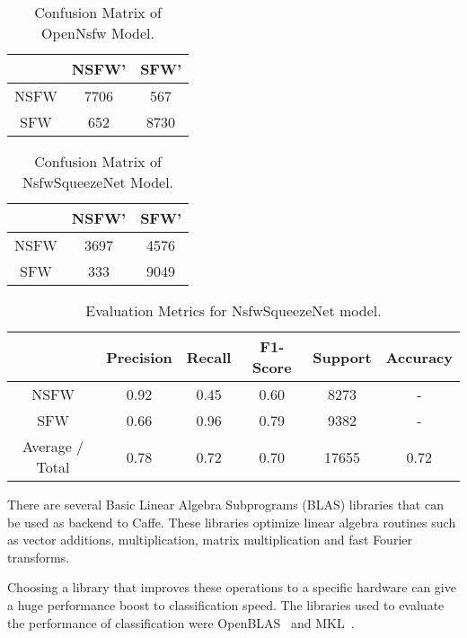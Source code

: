 \begin{table}[]
\centering
\caption{Confusion Matrix of OpenNsfw Model.}
\label{tbl:cm_opennsfw}
\begin{tabular}{c|c|c|}
\cline{2-3}
                           & NSFW' & SFW' \\ \hline
\multicolumn{1}{|c|}{NSFW} & 7706  & 567  \\ \hline
\multicolumn{1}{|c|}{SFW}  & 652   & 8730 \\ \hline
\end{tabular}
\end{table}

\begin{table}[]
\centering
\caption{Confusion Matrix of NsfwSqueezeNet Model.}
\label{tbl:cm_nsfwsqueeze}
\begin{tabular}{c|c|c|}
\cline{2-3}
                           & NSFW' & SFW' \\ \hline
\multicolumn{1}{|c|}{NSFW} & 3697  & 4576  \\ \hline
\multicolumn{1}{|c|}{SFW}  & 333   & 9049 \\ \hline
\end{tabular}
\end{table}


\begin{table}[]
\centering
\caption{Evaluation Metrics for NsfwSqueezeNet model.}
\label{tbl:metrics_nsfw_squeeze}
\begin{tabular}{c|c|c|c|c|c|}
\cline{2-6}
                                      & Precision & Recall & F1-Score & Support & Accuracy \\ \hline
\multicolumn{1}{|c|}{NSFW}            & 0.92      & 0.45   & 0.60     & 8273    & -        \\ \hline
\multicolumn{1}{|c|}{SFW}             & 0.66      & 0.96   & 0.79     & 9382    & -        \\ \hline
\multicolumn{1}{|c|}{Average / Total} & 0.78      & 0.72   & 0.70     & 17655   & 0.72     \\ \hline
\end{tabular}
\end{table}


There are several Basic Linear Algebra Subprograms (BLAS) libraries that can be used as backend to Caffe. These libraries optimize linear algebra routines such as vector additions, multiplication, matrix multiplication and fast Fourier transforms.

Choosing a library that improves these operations to a specific hardware can give a huge performance boost to classification speed. The libraries used to evaluate the performance of classification were OpenBLAS~\cite{openblas} and MKL~\cite{intelmkl}.

